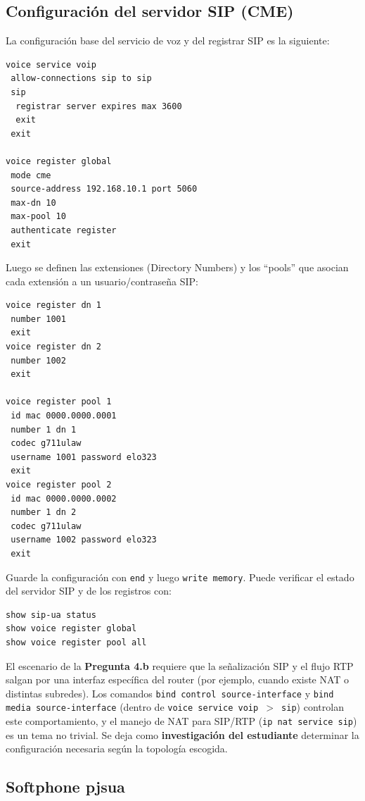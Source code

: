 \documentclass[letterpaper,12pt]{article}
\begin{document}
\subsection{Configuración del servidor SIP (CME)}

La configuración base del servicio de voz y del registrar SIP es la siguiente:

\begin{lstlisting}
voice service voip
 allow-connections sip to sip
 sip
  registrar server expires max 3600
  exit
 exit

voice register global
 mode cme
 source-address 192.168.10.1 port 5060
 max-dn 10
 max-pool 10
 authenticate register
 exit
\end{lstlisting}

Luego se definen las extensiones (Directory Numbers) y los ``pools'' que asocian cada extensión a un usuario/contraseña SIP:

\begin{lstlisting}
voice register dn 1
 number 1001
 exit
voice register dn 2
 number 1002
 exit

voice register pool 1
 id mac 0000.0000.0001
 number 1 dn 1
 codec g711ulaw
 username 1001 password elo323
 exit
voice register pool 2
 id mac 0000.0000.0002
 number 1 dn 2
 codec g711ulaw
 username 1002 password elo323
 exit
\end{lstlisting}

Guarde la configuración con \texttt{end} y luego \texttt{write memory}. Puede verificar el estado del servidor SIP y de los registros con:

\begin{lstlisting}
show sip-ua status
show voice register global
show voice register pool all
\end{lstlisting}

\begin{investigar}
El escenario de la \textbf{Pregunta 4.b} requiere que la señalización SIP y el flujo RTP salgan por una interfaz específica del router (por ejemplo, cuando existe NAT o distintas subredes). Los comandos \texttt{bind control source-interface} y \texttt{bind media source-interface} (dentro de \texttt{voice service voip $>$ sip}) controlan este comportamiento, y el manejo de NAT para SIP/RTP (\texttt{ip nat service sip}) es un tema no trivial. Se deja como \textbf{investigación del estudiante} determinar la configuración necesaria según la topología escogida.
\end{investigar}

\subsection{Softphone pjsua}
\end{document}
